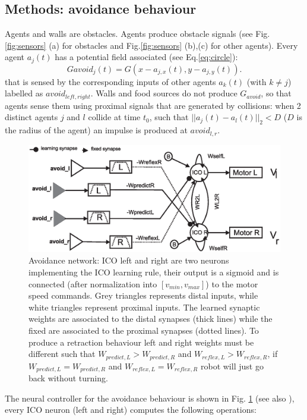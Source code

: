 \subsection{Methods: avoidance behaviour}
Agents and walls are obstacles. Agents produce obstacle
signals (see Fig.\ref{fig:sensors} (a) for obstacles and
Fig.\ref{fig:sensors} (b),(c) for other agents). Every agent $a_{j}(t)$ has a
potential field associated (see Eq.\ref{eq:circle}):
\begin{equation}
Gavoid_{j}(t)=G(x-a_{j,x}(t),y-a_{j,y}(t)).
\end{equation}
that is sensed by the corresponding inputs of other agents $a_{k}(t)$ (with $k\neq j$)
labelled as $avoid_{left,right}$. Walls and food sources
do not produce $G_{avoid}$, so that agents sense them using proximal signals that are
generated by collisions: when 2 distinct agents $j$ and $l$ collide at time $t_{0}$, such
that $||a_{j}(t)-a_{l}(t)||_{2}<D$ ($D$ is the radius of the
agent) an impulse is produced at $avoid_{l,r}$.
\begin{figure}[htb]
\begin{center}
\includegraphics[scale=0.45]{figures/socialadapt/avoidance.eps}
\end{center}
\vspace*{4pt}
\small{
\caption[Avoidance learning behaviour]{Avoidance network: ICO left and right are
two neurons implementing the ICO learning rule, their output is a sigmoid and
is connected (after normalization into $[v_{min},v_{max}]$) to the motor speed commands.
Grey triangles represents distal inputs, while white triangles represent proximal inputs.
The learned synaptic weights are associated to the distal synapses (thick lines) while
the fixed are associated to the proximal synapses (dotted lines).
To produce a retraction behaviour left and right weights must be different
such that
$W_{predict,L}>W_{predict,R}$ and $W_{reflex,L}>W_{reflex,R}$, if
$W_{predict,L}=W_{predict,R}$ and $W_{reflex,L}=W_{reflex,R}$ robot
will just go back without turning.\label{fig:avoidance}}}
\end{figure}
The neural controller for the avoidance behaviour is shown in
Fig. \ref{fig:avoidance} (see also \citep{Stamm2006}), every ICO neuron (left and right)
computes the following operations:

